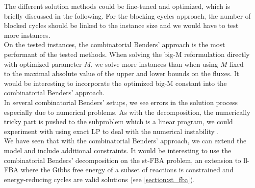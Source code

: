 \newpage
The different solution methods could be fine-tuned and optimized, which is briefly discussed in the following. For the blocking cycles approach, the number of blocked cycles should be linked to the instance size and we would have to test more instances. \\ 
On the tested instances, the combinatorial Benders' approach is the most performant of the tested methods. When solving the big-M reformulation directly with optimized parameter $M$, we solve more instances than when using $M$ fixed to the maximal absolute value of the upper and lower bounds on the fluxes. It would be interesting to incorporate the optimized big-M constant into the combinatorial Benders' approach.\\
In several combinatorial Benders' setups, we see errors in the solution process especially due to numerical problems. As with the decomposition, the numerically tricky part is pushed to the subproblem which is a linear program, we could experiment with using exact LP to deal with the numerical instability \cite{eifler_combining_2023}.
\\ We have seen that with the combinatorial Benders' approach, we can extend the model and include additional constraints. It would be interesting to use the combinatorial Benders' decomposition on the st-FBA problem, an extension to \textsf{ll-FBA} where the Gibbs free energy of a subset of reactions is constrained and energy-reducing cycles are valid solutions (see \cref{section:st_fba}).
\thispagestyle{plain}






